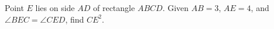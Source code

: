 Point $E$ lies on side $AD$ of rectangle $ABCD$. Given $AB=3$, $AE=4$, and $\angle BEC=\angle CED$, find $CE^2$.
